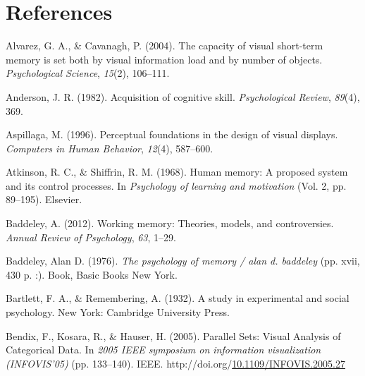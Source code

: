 \documentclass[print]{nuthesis}
\newlength{\cslhangindent}
\newenvironment{CSLReferences}[2]%
{\setlength{\parindent}{0pt}%
\everypar{\setlength{\hangindent}{\cslhangindent}}\ignorespaces}%
{\par}
\begin{document}
\backmatter

\hypertarget{references}{%
\chapter*{References}\label{references}}

\noindent

\setlength{\parindent}{-0.20in}
\setlength{\leftskip}{0.20in}
\setlength{\parskip}{8pt}

\hypertarget{refs}{}
\begin{CSLReferences}{1}{0}
\leavevmode{}%
Alvarez, G. A., \& Cavanagh, P. (2004). The capacity of visual short-term memory is set both by visual information load and by number of objects. \emph{Psychological Science}, \emph{15}(2), 106--111.

\leavevmode{}%
Anderson, J. R. (1982). Acquisition of cognitive skill. \emph{Psychological Review}, \emph{89}(4), 369.

\leavevmode{}%
Aspillaga, M. (1996). Perceptual foundations in the design of visual displays. \emph{Computers in Human Behavior}, \emph{12}(4), 587--600.

\leavevmode{}%
Atkinson, R. C., \& Shiffrin, R. M. (1968). Human memory: A proposed system and its control processes. In \emph{Psychology of learning and motivation} (Vol. 2, pp. 89--195). Elsevier.

\leavevmode{}%
Baddeley, A. (2012). Working memory: Theories, models, and controversies. \emph{Annual Review of Psychology}, \emph{63}, 1--29.

\leavevmode{}%
Baddeley, Alan D. (1976). \emph{The psychology of memory / alan d. baddeley} (pp. xvii, 430 p. :). Book, Basic Books New York.

\leavevmode{}%
Bartlett, F. A., \& Remembering, A. (1932). A study in experimental and social psychology. New York: Cambridge University Press.

\leavevmode{}%
Bendix, F., Kosara, R., \& Hauser, H. (2005). {Parallel Sets: Visual Analysis of Categorical Data}. In \emph{2005 IEEE symposium on information visualization (INFOVIS'05)} (pp. 133--140). IEEE. http://doi.org/\href{https://doi.org/10.1109/INFOVIS.2005.27}{10.1109/INFOVIS.2005.27}


\end{CSLReferences}
\end{document}

